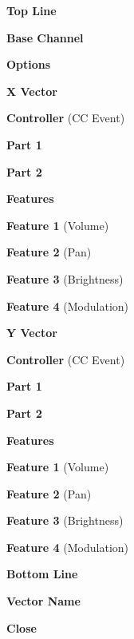    \begin{enumber}
      \item \textbf{Top Line}
      \begin{enumber}
         \item \textbf{Base Channel}
         \item \textbf{Options}
      \end{enumber}
      \item \textbf{X Vector}
      \begin{enumber}
         \item \textbf{Controller} (CC Event)
         \item \textbf{Part 1}
         \item \textbf{Part 2}
         \item \textbf{Features}
         \begin{enumber}
            \item \textbf{Feature 1} (Volume)
            \item \textbf{Feature 2} (Pan)
            \item \textbf{Feature 3} (Brightness)
            \item \textbf{Feature 4} (Modulation)
         \end{enumber}
      \end{enumber}
      \item \textbf{Y Vector}
      \begin{enumber}
         \item \textbf{Controller} (CC Event)
         \item \textbf{Part 1}
         \item \textbf{Part 2}
         \item \textbf{Features}
         \begin{enumber}
            \item \textbf{Feature 1} (Volume)
            \item \textbf{Feature 2} (Pan)
            \item \textbf{Feature 3} (Brightness)
            \item \textbf{Feature 4} (Modulation)
         \end{enumber}
      \end{enumber}
      \item \textbf{Bottom Line}
      \begin{enumber}
         \item \textbf{Vector Name}
         \item \textbf{Close}
      \end{enumber}
   \end{enumber}

